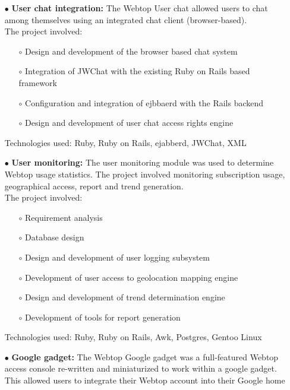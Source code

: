 \documentclass{scrartcl}
\begin{document}
\begin{cv}{
\href{http://www.develmj.com}{}
}
{\begin{itemize}
\begin{itemize}
engine
    \end{itemize}
    Technologies used: Ruby, Ruby on Rails, Postgres, Gentoo Linux
  \item[\footnotesize$\bullet$] \textbf{User chat integration: }The Webtop User chat allowed users to chat among
    themselves using an integrated chat client (browser-based).\\
    The project involved:
    \begin{itemize}
    \item[\footnotesize$\circ$] Design and development of the browser based chat system
    \item[\footnotesize$\circ$] Integration of JWChat with the existing Ruby on Rails based framework
    \item[\footnotesize$\circ$] Configuration and integration of ejbbaerd with the Rails backend
    \item[\footnotesize$\circ$] Design and development of user chat
      access rights engine
    \end{itemize}
    Technologies used: Ruby, Ruby on Rails, ejabberd, JWChat, XML
  \item[\footnotesize$\bullet$] \textbf{User monitoring: }The user monitoring module was used to determine
    Webtop usage statistics. The project involved monitoring subscription usage,
    geographical access, report and trend generation.\\
    The project involved:
    \begin{itemize}
    \item[\footnotesize$\circ$] Requirement analysis
    \item[\footnotesize$\circ$] Database design
    \item[\footnotesize$\circ$] Design and development of user logging subsystem
    \item[\footnotesize$\circ$] Development of user access to geolocation mapping engine
    \item[\footnotesize$\circ$] Design and development of trend determination engine
    \item[\footnotesize$\circ$] Development of tools for report
      generation
    \end{itemize}
    Technologies used: Ruby, Ruby on Rails, Awk, Postgres, Gentoo Linux
  \item[\footnotesize$\bullet$] \textbf{Google gadget: }The Webtop Google gadget was a full-featured Webtop
    access console re-written and miniaturized to work within a google gadget.
    This allowed users to integrate their Webtop account into their Google home

\end{itemize}}
\end{cv}
\end{document}
